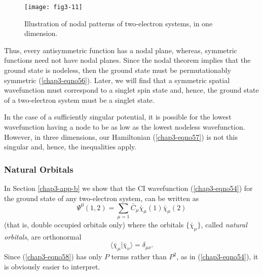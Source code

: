 \begin{figure}
\texttt{[image: fig3-11]}
\caption{Illustration of nodal patterns of two-electron systems, in
one dimension.}
\label{fig3-12}
\end{figure}

Thus, every antisymmetric function has a nodal plane, whereas,
symmetric functions need not have nodal planes. Since the nodal
theorem implies that the ground state is nodeless, then the ground
state must be permutationably symmetric (\ref{chap3-eqno56}).  Later,
we will find that a symmetric spatial wavefunction must correspond to
a singlet spin state and, hence, the ground state of a two-electron
system must be a singlet state.

In the case of a sufficiently singular potential, it is possible for
the lowest wavefunction having a node to be as low as the lowest
nodeless wavefunction.  However, in three dimensions, our Hamiltonian
(\ref{chap3-eqno57}) is not this singular and, hence, the inequalities
apply.

\subsubsection{Natural Orbitals}

In Section \ref{chap3-app-b} we show that the CI wavefunction
(\ref{chap3-eqno54}) for the ground state of any two-electron system,
can be written as
\begin{equation}
\Psi^0 (1,2) = \sum_{\mu =1} {\bar C}_{\mu} {\bar \chi}_{\mu} (1) 
{\bar \chi}_{\mu} (2)
\label{chap3-eqno58}
\end{equation}
(that is, double occupied orbitals only) where the orbitals $\{ {\bar
\chi}_{\mu} \}$, called \emph{natural orbitals}, are orthonormal
\begin{equation}
\langle {\bar \chi}_{\mu} \vert {\bar \chi}_{\nu} \rangle 
=\delta_{\mu \nu} .
\end{equation}
Since (\ref{chap3-eqno58}) has only $P$ terms rather than $P^2$, as in
(\ref{chap3-eqno54}), it is obviously easier to interpret.

